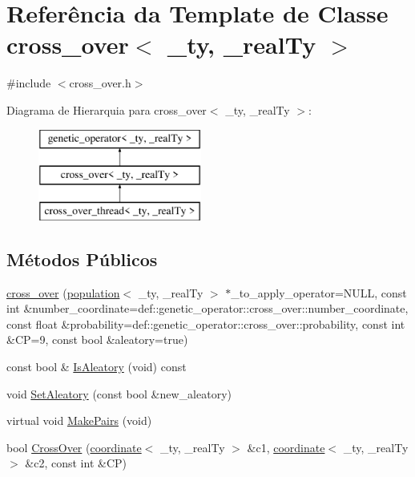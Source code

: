 \hypertarget{classcross__over}{
\section{Referência da Template de Classe cross\_\-over$<$ \_\-ty, \_\-realTy $>$}
\label{classcross__over}
}


{\ttfamily \#include $<$cross\_\-over.h$>$}

Diagrama de Hierarquia para cross\_\-over$<$ \_\-ty, \_\-realTy $>$:\begin{figure}[H]
\begin{center}
\leavevmode
\includegraphics[height=3cm]{classcross__over}
\end{center}
\end{figure}
\subsection*{Métodos Públicos}
\begin{DoxyCompactItemize}
\item 
\hyperlink{classcross__over_aa3561392e40e80aec88cc88aab4f988d}{cross\_\-over} (\hyperlink{classpopulation}{population}$<$ \_\-ty, \_\-realTy $>$ $\ast$\_\-to\_\-apply\_\-operator=NULL, const int \&number\_\-coordinate=def::genetic\_\-operator::cross\_\-over::number\_\-coordinate, const float \&probability=def::genetic\_\-operator::cross\_\-over::probability, const int \&CP=9, const bool \&aleatory=true)
\item 
const bool \& \hyperlink{classcross__over_a62fa09dbf5e970644ea151d78ce8e2eb}{IsAleatory} (void) const 
\item 
void \hyperlink{classcross__over_a69f0a44b51940c67f996e9da5cda250b}{SetAleatory} (const bool \&new\_\-aleatory)
\item 
virtual void \hyperlink{classcross__over_a241401bf77d5c8c465991baa90b1d01b}{MakePairs} (void)
\item 
bool \hyperlink{classcross__over_ace759185adf45d08ece996286c69542f}{CrossOver} (\hyperlink{classcoordinate}{coordinate}$<$ \_\-ty, \_\-realTy $>$ \&c1, \hyperlink{classcoordinate}{coordinate}$<$ \_\-ty, \_\-realTy $>$ \&c2, const int \&CP)
\end{DoxyCompactItemize}
